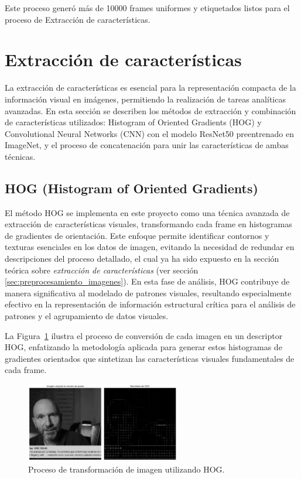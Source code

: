 Este proceso generó más de 10000 frames uniformes y etiquetados listos para el proceso de Extracción de características.

\section{Extracción de características}
La extracción de características es esencial para la representación compacta de la información visual en imágenes, permitiendo la realización de tareas analíticas avanzadas. En esta sección se describen los métodos de extracción y combinación de características utilizados: Histogram of Oriented Gradients (HOG) y Convolutional Neural Networks (CNN) con el modelo ResNet50 preentrenado en ImageNet, y el proceso de concatenación para unir las características de ambas técnicas.

\subsection{HOG (Histogram of Oriented Gradients)}

El método HOG se implementa en este proyecto como una técnica avanzada de extracción de características visuales, transformando cada frame en histogramas de gradientes de orientación. Este enfoque permite identificar contornos y texturas esenciales en los datos de imagen, evitando la necesidad de redundar en descripciones del proceso detallado, el cual ya ha sido expuesto en la sección teórica sobre \textit{extracción de características} (ver sección \ref{sec:preprocesamiento_imagenes}). En esta fase de análisis, HOG contribuye de manera significativa al modelado de patrones visuales, resultando especialmente efectivo en la representación de información estructural crítica para el análisis de patrones y el agrupamiento de datos visuales.

La Figura~\ref{fig:preproc-crop} ilustra el proceso de conversión de cada imagen en un descriptor HOG, enfatizando la metodología aplicada para generar estos histogramas de gradientes orientados que sintetizan las características visuales fundamentales de cada frame. 

\begin{figure}[H]
    \centering
    \includegraphics[width=0.60\textwidth]{4/figures/HOG_1.png}
    \caption{Proceso de transformación de imagen utilizando HOG.}
    \label{fig:preproc-crop}
\end{figure}

